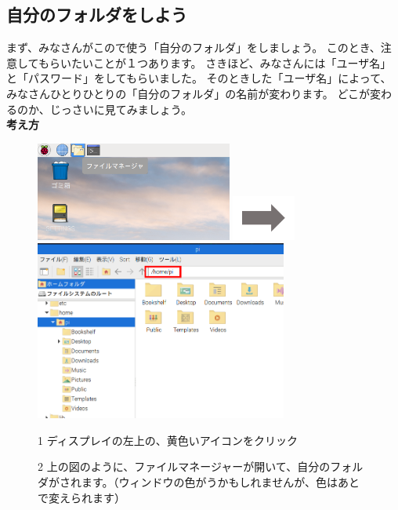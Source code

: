 \documentclass[a4paper,12pt]{jarticle}
\begin{document}
\clearpage

\subsection{\theExercise 自分のフォルダをしよう}
まず、みなさんがこので使う「自分のフォルダ」をしましょう。
このとき、注意してもらいたいことが１つあります。
さきほど、みなさんには「ユーザ名」と「パスワード」をしてもらいました。
そのときした「ユーザ名」によって、みなさんひとりひとりの「自分のフォルダ」の名前が変わります。
どこが変わるのか、じっさいに見てみましょう。\\

{\bf \large 考え方}\\
\begin{figure}[ht]
\begin{minipage}{\textwidth}
  \includegraphics[width=6.472cm]{textbook-img032.png}
  \includegraphics[width=2.094cm]{textbook-img035.png}
  \includegraphics[width=8.301cm]{textbook-img1020.png}
\end{minipage}
\begin{minipage}{0.4\textwidth}
  1
  ディスプレイの左上の、黄色いアイコンをクリック
\end{minipage}
\vspace{20pt}
\hfill
\begin{minipage}{0.4\textwidth}
  2
  上の図のように、ファイルマネージャーが開いて、自分のフォルダがされます。（ウィンドウの色がうかもしれませんが、色はあとで変えられます）
\end{minipage}
\end{figure}
\end{document}
